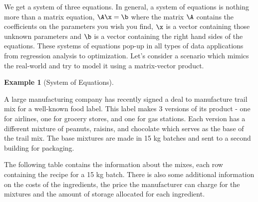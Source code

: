 \documentclass[
]{article}
\theoremstyle{definition}
\theoremstyle{definition}
\newtheorem{example}{Example}[section]
\theoremstyle{definition}
\theoremstyle{definition}
\theoremstyle{remark}
\begin{document}
We get a system of three equations. In general, a system of equations is nothing more than a matrix equation, \(\A\x=\b\) where the matrix \(\A\) contains the coefficients on the parameters you wish you find, \(\x\) is a vector containing those unknown parameters and \(\b\) is a vector containing the right hand sides of the equations. These systems of equations pop-up in all types of data applications from regression analysis to optimization. Let's consider a scenario which mimics the real-world and try to model it using a matrix-vector product.

\begin{example}[System of Equations]
\protect\hypertarget{exm:syseq}{}\label{exm:syseq}

A large manufacturing company has recently signed a deal to manufacture trail mix for a well-known food label. This label makes 3 versions of its product - one for airlines, one for grocery stores, and one for gas stations. Each version has a different mixture of peanuts, raisins, and chocolate which serves as the base of the trail mix. The base mixtures are made in 15 kg batches and sent to a second building for packaging.

The following table contains the information about the mixes, each row containing the recipe for a 15 kg batch. There is also some additional information on the costs of the ingredients, the price the manufacturer can charge for the mixtures and the amount of storage allocated for each ingredient.


\end{example}
\end{document}
